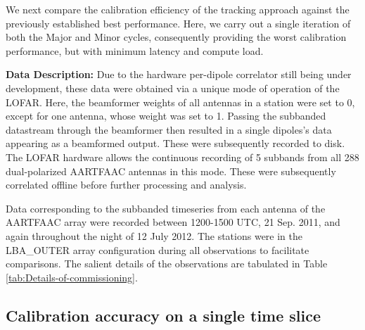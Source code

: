 \documentclass{aa}
\begin{document}
We next compare the calibration  efficiency of the tracking approach against the
previously established best  performance. Here, we carry out  a single iteration
of both the Major and Minor cycles, consequently providing the worst calibration
performance,   but  with   minimum  latency   and  compute   load.

\begin{table}[h]
\caption{Details of commissioning observations carried out with the AARTFAAC}
\label{tab:Details-of-commissioning}
\end{table}

\textbf{Data Description:} Due to the hardware per-dipole correlator still being
under development,  these data were obtained  via a unique mode  of operation of
the LOFAR. Here, the beamformer weights of all antennas in a station were set to
0, except  for one antenna, whose weight  was set to 1.   Passing the subbanded
datastream  through the  beamformer then  resulted  in a  single dipoles's  data
appearing as a beamformed output. These were subsequently recorded to disk. The
LOFAR  hardware allows  the  continuous recording  of  5 subbands  from all  288
dual-polarized  AARTFAAC  antennas  in   this  mode.   These  were  subsequently
correlated offline before further processing and analysis.

Data corresponding to the subbanded timeseries from each antenna of the AARTFAAC
array were  recorded between 1200-1500 UTC,  21 Sep. 2011,  and again throughout
the  night  of  12  July  2012.   The stations  were  in  the  LBA\_OUTER  array
configuration during  all observations  to facilitate comparisons.   The salient
details     of      the     observations     are      tabulated     in     Table
\ref{tab:Details-of-commissioning}. 




\subsection{\label{sec:calib-accuracy}Calibration accuracy on a single time slice}
\end{document}
